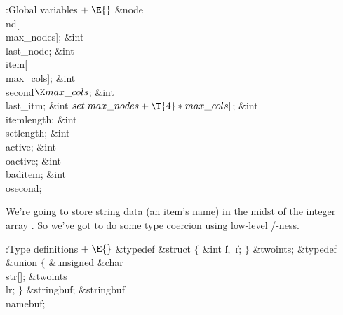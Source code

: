 \B{}:Global variables\X${}\mathrel+\E{}$\6
\&{node} \\{nd}[\\{max\_nodes}];\6
\&{int} \\{last\_node};\6
\&{int} \\{item}[\\{max\_cols}];\6
\&{int} \\{second}${}\K\\{max\_cols}{}$;\6
\&{int} \\{last\_itm};\6
\&{int} ${}\\{set}[\\{max\_nodes}+\T{4}*\\{max\_cols}]{}$;\6
\&{int} \\{itemlength};\6
\&{int} \\{setlength};\6
\&{int} \\{active};\6
\&{int} \\{oactive};\6
\&{int} \\{baditem};\6
\&{int} \\{osecond};%
\par
\fi

We're going to store string data (an item's name) in the midst of
the integer array . So we've got to do some type coercion using
low-level \CEE/-ness.

\Y\B\4:Type definitions\X${}\mathrel+\E{}$\6
\&{typedef} \&{struct} ${}\{{}$\1\6
\&{int} \|l${},{}$ \|r;\2\6
${}\}{}$ \&{twoints};\6
\&{typedef} \&{union} ${}\{{}$\1\6
\&{unsigned} \&{char} \\{str}[];\6
\&{twoints} \\{lr};\2\6
${}\}{}$ \&{stringbuf};\6
\&{stringbuf} \\{namebuf};\par
\fi

